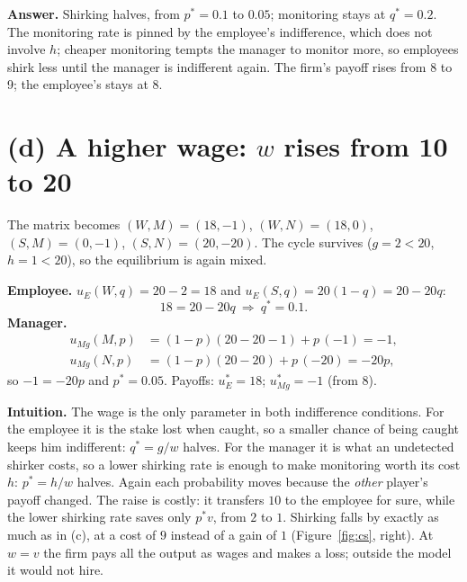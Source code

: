 \documentclass[11pt,a4paper]{article}
\newcommand{\answer}[1]{\begin{tcolorbox}[colback=ans!5,colframe=ans,boxrule=0.6pt,
  left=5pt,right=5pt,top=3pt,bottom=3pt]\textbf{Answer.} #1\end{tcolorbox}}
\begin{document}
\answer{Shirking halves, from $p^* = 0.1$ to $0.05$; monitoring stays at $q^* = 0.2$. The
monitoring rate is pinned by the employee's indifference, which does not involve $h$; cheaper
monitoring tempts the manager to monitor more, so employees shirk less until the manager is
indifferent again. The firm's payoff rises from 8 to 9; the employee's stays at 8.}

\section*{(d) A higher wage: $w$ rises from 10 to 20}

The matrix becomes $(W, M) = (18, -1)$, $(W, N) = (18, 0)$, $(S, M) = (0, -1)$, $(S, N) = (20, -20)$.
The cycle survives ($g = 2 < 20$, $h = 1 < 20$), so the equilibrium is again mixed.

\textbf{Employee.} $u_E(W, q) = 20 - 2 = 18$ and $u_E(S, q) = 20(1 - q) = 20 - 20q$:
\[
  18 = 20 - 20q \ \Longrightarrow\ q^* = 0.1.
\]
\textbf{Manager.}
\begin{align*}
  u_{M\!g}(M, p) &= (1 - p)(20 - 20 - 1) + p\,(-1) = -1,\\
  u_{M\!g}(N, p) &= (1 - p)(20 - 20) + p\,(-20) = -20p,
\end{align*}
so $-1 = -20p$ and $p^* = 0.05$.
Payoffs: $u_E^* = 18$; $u_{M\!g}^* = -1$ (from 8).

\textbf{Intuition.} The wage is the only parameter in both indifference conditions. For the employee
it is the stake lost when caught, so a smaller chance of being caught keeps him indifferent:
$q^* = g/w$ halves. For the manager it is what an undetected shirker costs, so a lower shirking rate
is enough to make monitoring worth its cost $h$: $p^* = h/w$ halves. Again each probability moves
because the \emph{other} player's payoff changed. The raise is costly: it transfers $10$ to the
employee for sure, while the lower shirking rate saves only $p^* v$, from $2$ to $1$. Shirking falls
by exactly as much as in (c), at a cost of $9$ instead of a gain of $1$ (Figure~\ref{fig:cs}, right).
At $w = v$ the firm pays all the output as wages and makes a loss; outside the model it would not hire.
\end{document}
